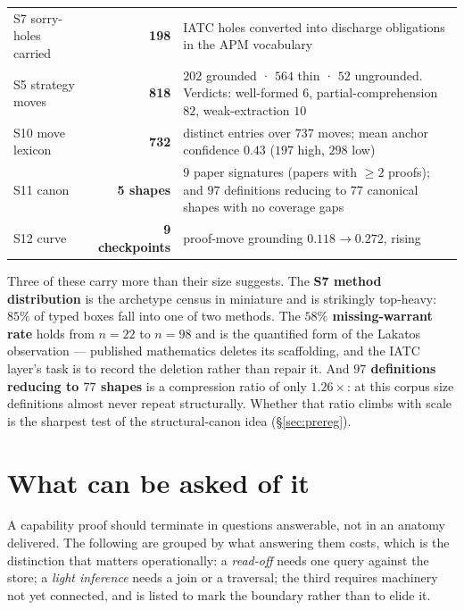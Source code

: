 \begin{center}
\begin{tabular}{p{} r p{}}
S7 sorry-holes carried & \textbf{198} &
IATC holes converted into discharge obligations in the APM vocabulary\\[3pt]
S5 strategy moves & \textbf{818} &
$202$ grounded · $564$ thin · $52$ ungrounded. Verdicts: well-formed $6$,
partial-comprehension $82$, weak-extraction $10$\\[3pt]
S10 move lexicon & \textbf{732} &
distinct entries over $737$ moves; mean anchor confidence $0.43$ ($197$ high,
$298$ low)\\[3pt]
S11 canon & \textbf{5 shapes} &
$9$ paper signatures (papers with $\ge 2$ proofs); and $97$ definitions
reducing to $77$ canonical shapes with no coverage gaps\\[3pt]
S12 curve & \textbf{9 checkpoints} &
proof-move grounding $0.118 \to 0.272$, rising\\
\hline
\end{tabular}
\end{center}

Three of these carry more than their size suggests. The \textbf{S7 method
distribution} is the archetype census in miniature and is strikingly top-heavy:
$85\%$ of typed boxes fall into one of two methods. The \textbf{$58\%$
missing-warrant rate} holds from $n{=}22$ to $n{=}98$ and is the quantified form
of the Lakatos observation --- published mathematics deletes its scaffolding,
and the IATC layer's task is to record the deletion rather than repair it. And
\textbf{$97$ definitions reducing to $77$ shapes} is a compression ratio of
only $1.26\times$: at this corpus size definitions almost never repeat
structurally. Whether that ratio climbs with scale is the sharpest test of the
structural-canon idea (\S\ref{sec:prereg}).

\section{What can be asked of it}
\label{sec:queries}

A capability proof should terminate in questions answerable, not in an anatomy
delivered. The following are grouped by what answering them costs, which is the
distinction that matters operationally: a \emph{read-off} needs one query
against the store; a \emph{light inference} needs a join or a traversal; the
third requires machinery not yet connected, and is listed to mark the boundary
rather than to elide it.

